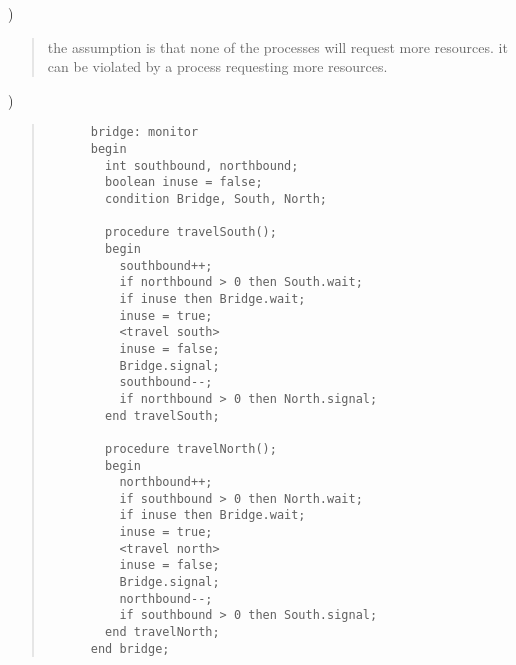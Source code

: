 \documentclass[11pt]{article}
\newenvironment{subquestion}[1]{#1) \begin{quote}}{\end{quote}}
\begin{document}
  \begin{subquestion}{7.24}
    the assumption is that none of the processes will request more resources.
    it can be violated by a process requesting more resources.
  \end{subquestion}

  \clearpage
  \begin{subquestion}{7.25}
    \begin{verbatim}
      bridge: monitor
      begin
        int southbound, northbound;
        boolean inuse = false;
        condition Bridge, South, North;

        procedure travelSouth();
        begin
          southbound++;
          if northbound > 0 then South.wait;
          if inuse then Bridge.wait;
          inuse = true;
          <travel south>
          inuse = false;
          Bridge.signal;
          southbound--;
          if northbound > 0 then North.signal;
        end travelSouth;

        procedure travelNorth();
        begin
          northbound++;
          if southbound > 0 then North.wait;
          if inuse then Bridge.wait;
          inuse = true;
          <travel north>
          inuse = false;
          Bridge.signal;
          northbound--;
          if southbound > 0 then South.signal;
        end travelNorth;
      end bridge;
    \end{verbatim}
  \end{subquestion}
\end{document}
